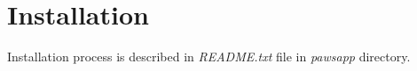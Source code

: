 \section{Installation}
\label{installation}

Installation process is described in \emph{README.txt} file in \emph{pawsapp} directory.

